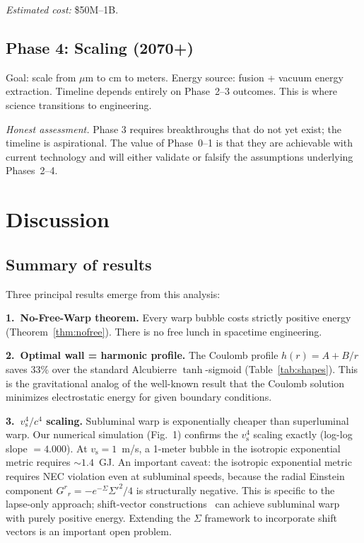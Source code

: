 \documentclass[prd,twocolumn,superscriptaddress,longbibliography]{revtex4-2}
\newcommand{\vs}{v_{\mathrm{s}}}
\begin{document}
\textit{Estimated cost:} \$50M--1B.

\subsection{Phase 4: Scaling (2070+)}

Goal: scale from $\mu$m to cm to meters.  Energy source:
fusion + vacuum energy extraction.  Timeline depends entirely
on Phase~2--3 outcomes.  This is where science transitions to
engineering.

\textit{Honest assessment.}\;  Phase 3 requires breakthroughs
that do not yet exist; the timeline is aspirational.  The value
of Phase~0--1 is that they are achievable with current technology
and will either validate or falsify the assumptions underlying
Phases~2--4.

\section{Discussion}
\label{sec:discussion}

\subsection{Summary of results}

Three principal results emerge from this analysis:

\medskip
\noindent\textbf{1.\ No-Free-Warp theorem.}\;
Every warp bubble costs strictly positive energy
(Theorem~\ref{thm:nofree}).  There is no free lunch in
spacetime engineering.

\medskip
\noindent\textbf{2.\ Optimal wall = harmonic profile.}\;
The Coulomb profile $h(r) = A + B/r$ saves 33\% over the
standard Alcubierre $\tanh$-sigmoid (Table~\ref{tab:shapes}).
This is the gravitational analog of the well-known result that
the Coulomb solution minimizes electrostatic energy for given
boundary conditions.

\medskip
\noindent\textbf{3.\ $\vs^4/c^4$ scaling.}\;
Subluminal warp is exponentially cheaper than superluminal warp.
Our numerical simulation (Fig.~1) confirms the $\vs^4$ scaling
exactly (log-log slope $= 4.000$).  At $\vs = 1$~m/s, a 1-meter
bubble in the isotropic exponential metric requires $\sim 1.4$~GJ.
An important caveat: the isotropic exponential metric requires NEC
violation even at subluminal speeds, because the radial Einstein
component $G^r{}_r = -e^{-\Sigma}\Sigma'^2/4$ is structurally
negative.  This is specific to the lapse-only approach; shift-vector
constructions~\cite{Fuchs2024} can achieve subluminal warp with
purely positive energy.  Extending the $\Sigma$ framework to
incorporate shift vectors is an important open problem.
\end{document}
